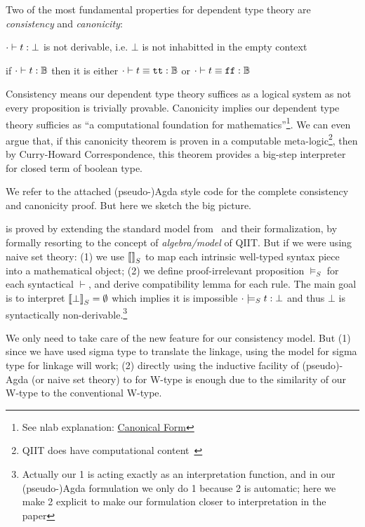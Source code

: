 Two of the most fundamental properties for dependent type theory are \textit{consistency} and \textit{canonicity}:
\begin{theorem}[Consistency]
  $ {\cdot} \vdash {t} : {\bot} $ is not derivable, i.e. $\bot$ is not inhabitted in the empty context
\end{theorem}
\begin{theorem}[Canonicity]
  if $ {\cdot} \vdash {t} : {\mathbb{B}} $ then it is either $ {\cdot} \vdash {t \equiv \ensuremath{\texttt{tt}}} : {\mathbb{B}} $ or $ {\cdot} \vdash {t \equiv \ensuremath{\texttt{ff}}} : {\mathbb{B}} $
\end{theorem}
Consistency means our dependent type theory suffices as a logical system as not every proposition is trivially provable. Canonicity implies our dependent type theory sufficies as ``a computational foundation for mathematics''\footnote{See nlab explanation: \href{https://ncatlab.org/nlab/show/canonical+form}{Canonical Form}}. We can even argue that, if this canonicity theorem is proven in a computable meta-logic\footnote{QIIT does have computational content~\cite{altkap2016}}, 
then by Curry-Howard Correspondence, this theorem provides a big-step interpreter for closed term of boolean type. 

We refer to the attached (pseudo-)Agda style code for the complete consistency and canonicity proof. But here we sketch the big picture.




 is proved by extending the standard model from~\cite{altkap2016,kaposi2017type, kaposi2019gluing} and their formalization, by formally resorting to the concept of \textit{algebra/model} of QIIT. But if we were using naive set theory: (1) we use ${\llbracket {} \rrbracket}_S$ to map each intrinsic well-typed syntax piece into a mathematical object; (2) we define proof-irrelevant proposition $\models_S$ for each syntactical $\vdash$, and derive compatibility lemma for each rule. The main goal is to interpret ${\llbracket {\bot} \rrbracket}_S = \emptyset$ which implies it is impossible ${ {\cdot} \models_S {t} : {\bot} }$ and thus $\bot$ is syntactically non-derivable.\footnote{Actually our 1 is acting exactly as an interpretation function, and in our (pseudo-)Agda formulation we only do 1 because 2 is automatic; here we make 2 explicit to make our formulation closer to interpretation in the paper}

We only need to take care of the new feature for our consistency model. But (1) since we have used sigma type to translate the linkage, using the model for sigma type for linkage will work; (2) directly using the inductive facility of (pseudo)-Agda (or naive set theory) to for W-type is enough due to the similarity of our W-type to the conventional W-type.

